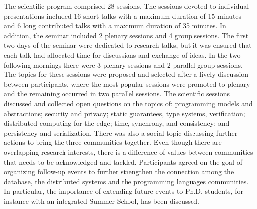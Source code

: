 \documentclass[a4paper,UKenglish]{dagrep-v2018}
\begin{document}
The scientific program comprised 28 sessions. The sessions devoted to individual presentations included 16 short talks with a maximum duration of 15 minutes and 6 long contributed talks with a maximum duration of 35 minutes.
In addition, the seminar included 2 plenary sessions and 4 group sessions. 
The first two days of the seminar were dedicated to research talks, but it was ensured that each talk had  
allocated time for discussions and exchange of ideas. In the two following mornings there were 3 plenary sessions and 2 parallel group sessions.
The topics for these sessions were proposed and selected after a lively discussion between participants, 
where the most popular sessions were promoted to plenary and the remaining occurred in two parallel sessions.
The scientific sessions discussed and collected open questions on the topics of: programming models and abstractions; security and privacy; 
static guarantees, type systems, verification; distributed computing for the edge; time, synchrony, and consistency; and persistency and serialization. There was also a social topic discussing further actions to bring the three communities together. Even though there are overlapping research interests, there is a difference of values between communities that needs to be acknowledged and tackled.
Participants agreed on the goal of organizing follow-up events to further strengthen the connection
among the database, the distributed systems and the programming languages communities. In particular, the importance of extending future events to Ph.D. students, for instance with an integrated Summer School, has been discussed.

\end{document}

